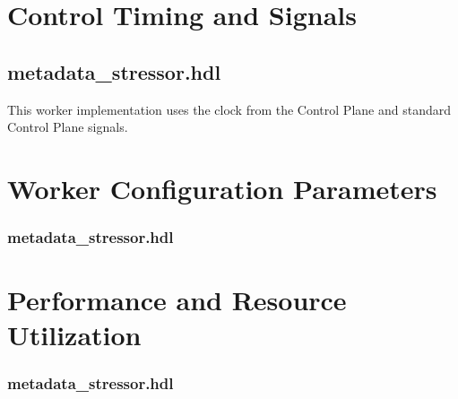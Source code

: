 \documentclass{article}
\def\comp{metadata\_stressor}
\edef\ecomp{metadata_stressor}
\begin{document}
\section*{Control Timing and Signals}
\subsection*{\comp.hdl}
\begin{flushleft}
This worker implementation uses the clock from the Control Plane and standard Control Plane signals.
\end{flushleft}

\begin{landscape}
\section*{Worker Configuration Parameters}
\subsubsection*{\comp.hdl}
%
\section*{Performance and Resource Utilization}
\subsubsection*{\comp.hdl}
%
\end{landscape}
\end{document}
